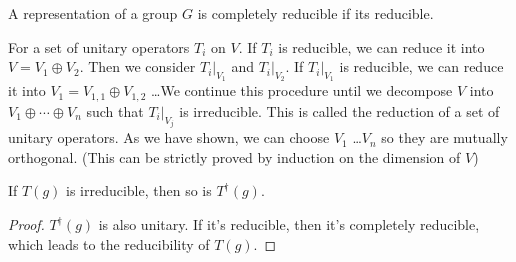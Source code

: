 \documentclass[12pt]{book}
\begin{document}
	\begin{lemma}
		A representation of a group $G$ is completely reducible if its reducible.
	\end{lemma}
	
	For a set of unitary operators $T_i$ on $V$. If $T_i$ is reducible, we can reduce it into $V=V_1\oplus V_2$. Then we consider $T_i|_{V_1}$ and $T_i|_{V_2}$. If $T_i|_{V_1}$ is reducible, we can reduce it into $V_1=V_{1,1}\oplus V_{1,2}$ \dots We continue this procedure until we decompose $V$ into $V_1\oplus\cdots\oplus V_n$ such that $T_i|_{V_j}$ is irreducible. This is called the reduction of a set of unitary operators. As we have shown, we can choose $V_1$ \dots $V_n$ so they are mutually orthogonal. (This can be strictly proved by induction on the dimension of $V$)
	
	\begin{lemma}
		If $T(g)$ is irreducible, then so is $T^\dagger(g)$. 
	\end{lemma}
	\begin{proof}
		 $T^\dagger(g)$ is also unitary. If it's reducible, then it's completely reducible, which leads to the reducibility of $T(g)$.
	\end{proof}
\end{document}
